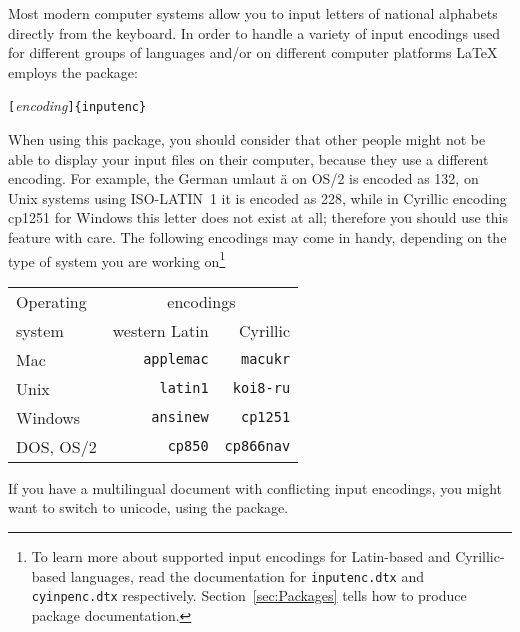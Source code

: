 \newcommand{\ieih}[1]{%
\index{encodings!input!#1@\texttt{#1}}%
\index{input encodings!#1@\texttt{#1}}%
\index{#1@\texttt{#1}}}
\newcommand{\iei}[1]{%
\ieih{#1}\texttt{#1}}
\newcommand{\feih}[1]{%
\index{encodings!font!#1@\texttt{#1}}%
\index{font encodings!#1@\texttt{#1}}%
\index{#1@\texttt{#1}}}
\newcommand{\fei}[1]{%
\feih{#1}\texttt{#1}}

Most modern computer systems allow you to input letters of
national alphabets  directly from the keyboard. In order to 
handle a variety of input encodings used for different groups of 
languages and/or on different computer platforms \LaTeX{} employs the
 package:
\begin{lscommand}
\verb|[|\emph{encoding}\verb|]{inputenc}|
\end{lscommand}

When using this package, you should consider that other people might not
be able to display your input files on their computer, because they use
a different encoding. For example, the German umlaut \"a on OS/2 is
encoded as 132, on Unix systems using ISO-LATIN~1 it is encoded as 228,
while in Cyrillic encoding cp1251 for Windows this letter does not exist
at all; therefore you should use this feature with care. The following
encodings may come in handy, depending on the type of system you are
working on\footnote{To learn more about supported  input
encodings for Latin-based and Cyrillic-based languages, read the
documentation for \texttt{inputenc.dtx} and \texttt{cyinpenc.dtx}
respectively. Section~\ref{sec:Packages} tells how to produce package
documentation.}

\begin{center}
\begin{tabular}{l | r | r }
Operating & \multicolumn{2}{c}{encodings}\\
system  & western Latin      & Cyrillic\\
\hline
Mac     &  \iei{applemac} & \iei{macukr}  \\
Unix    &  \iei{latin1}   & \iei{koi8-ru}  \\ 
Windows &  \iei{ansinew}  & \iei{cp1251}    \\
DOS, OS/2  &  \iei{cp850} & \iei{cp866nav}
\end{tabular}                
\end{center}                 

If you have a multilingual document with conflicting input encodings,
you might want to switch to unicode, using the  package.


